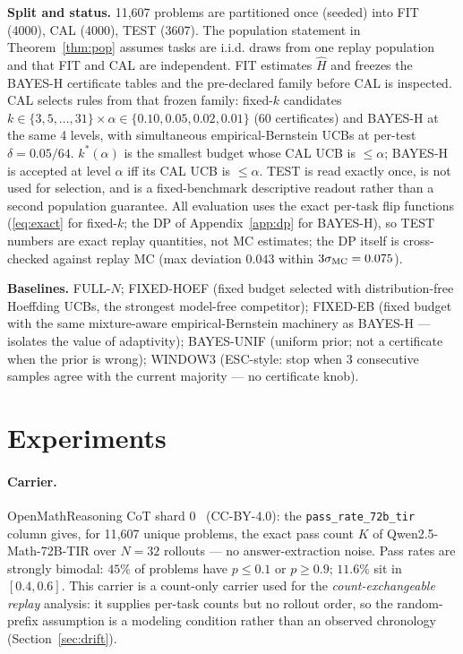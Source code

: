 \documentclass{article}
\theoremstyle{definition}
\theoremstyle{remark}
\begin{document}
\textbf{Split and status.} 11{,}607 problems are partitioned once (seeded)
into FIT (4000), CAL (4000), TEST (3607). The population statement in
Theorem~\ref{thm:pop} assumes tasks are i.i.d. draws from one replay
population and that FIT and CAL are independent. FIT estimates $\widehat H$
and freezes the BAYES-H certificate tables and the pre-declared family before
CAL is inspected. CAL selects rules from that frozen family:
fixed-$k$ candidates $k\in\{3,5,\dots,31\}\times\alpha\in\{0.10,0.05,0.02,
0.01\}$ (60 certificates) and BAYES-H at the same 4 levels, with simultaneous
empirical-Bernstein UCBs at per-test $\delta=0.05/64$. $k^*(\alpha)$ is the
smallest budget whose CAL UCB is $\le\alpha$; BAYES-H is accepted at level
$\alpha$ iff its CAL UCB is $\le\alpha$. TEST is read exactly once, is not
used for selection, and is a fixed-benchmark descriptive readout rather than
a second population guarantee. All evaluation uses the exact per-task flip
functions (\eqref{eq:exact} for
fixed-$k$; the DP of Appendix~\ref{app:dp} for BAYES-H), so TEST numbers are
exact replay quantities, not MC estimates; the DP itself is cross-checked
against replay MC (max deviation $0.043$ within $3\sigma_{\rm MC}=0.075$).

\textbf{Baselines.} FULL-$N$; FIXED-HOEF (fixed budget selected with
distribution-free Hoeffding UCBs, the strongest model-free competitor);
FIXED-EB (fixed budget with the same mixture-aware empirical-Bernstein
machinery as BAYES-H --- isolates the value of adaptivity);
BAYES-UNIF (uniform prior; not a certificate when the prior is wrong);
WINDOW3 (ESC-style: stop when 3 consecutive samples agree with the current
majority --- no certificate knob).

\section{Experiments}
\label{sec:experiments}

\paragraph{Carrier.} OpenMathReasoning CoT shard 0~\citep{moshkov2025openmathreasoning} (CC-BY-4.0): the
\texttt{pass\_rate\_72b\_tir} column gives, for 11{,}607 unique problems, the
exact pass count $K$ of Qwen2.5-Math-72B-TIR over $N=32$ rollouts --- no
answer-extraction noise. Pass rates are strongly bimodal: $45\%$ of problems
have $p\le0.1$ or $p\ge0.9$; $11.6\%$ sit in $[0.4,0.6]$. This carrier is a
count-only carrier used for the \emph{count-exchangeable replay} analysis:
it supplies per-task counts but no rollout order, so the random-prefix
assumption is a modeling condition rather than an observed chronology
(Section~\ref{sec:drift}).
\end{document}
